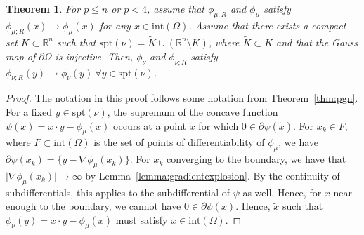 \documentclass{amsart}
\newtheorem{theorem}{Theorem}
\theoremstyle{lemma}
\theoremstyle{remark}
\begin{document}
\begin{theorem}\label{thm:pleqninverse}
For $p\leq n$ or $p<4$, assume that $\phi_{\mu;R}$ and $\phi_{\mu}$ satisfy $\phi_{\mu;R}(x) \rightarrow \phi_{\mu}(x)$ for any $x \in \text{int}(\Omega)$. Assume that there exists a compact set $K \subset \mathbb{R}^n$ such that $\text{spt}(\nu) = \tilde{K} \cup (\mathbb{R}^n \setminus K)$, where $\tilde{K} \subset K$ and that the Gauss map of $\partial \Omega$ is injective. Then, $\phi_{\nu}$ and $\phi_{\nu;R}$ satisfy $\phi_{\nu;R}(y) \rightarrow \phi_{\nu}(y) \ \forall y \in \text{spt}(\nu)$.
\end{theorem}

\begin{proof}
The notation in this proof follows some notation from Theorem~\ref{thm:pgn}. For a fixed $y \in \text{spt}(\nu)$, the supremum of the concave function $\psi(x) = x \cdot y - \phi_{\mu}(x)$ occurs at a point $\tilde{x}$ for which $0 \in \partial \psi(\tilde{x})$. For $x_{k} \in F$, where $F \subset \text{int}(\Omega)$ is the set of points of differentiability of $\phi_{\mu}$, we have $\partial \psi(x_k) = \{ y - \nabla \phi_{\mu}(x_k) \}$. For $x_k$ converging to the boundary, we have that $\vert \nabla \phi_{\mu}(x_k) \vert \rightarrow \infty$ by Lemma~\ref{lemma:gradientexplosion}. By the continuity of subdifferentials, this applies to the subdifferential of $\psi$ as well. Hence, for $x$ near enough to the boundary, we cannot have $0 \in \partial \psi(x)$. Hence, $\tilde{x}$ such that $\phi_{\nu}(y) = \tilde{x} \cdot y - \phi_{\mu}(\tilde{x})$ must satisfy $\tilde{x} \in \text{int}(\Omega)$.



\end{proof}
\end{document}
